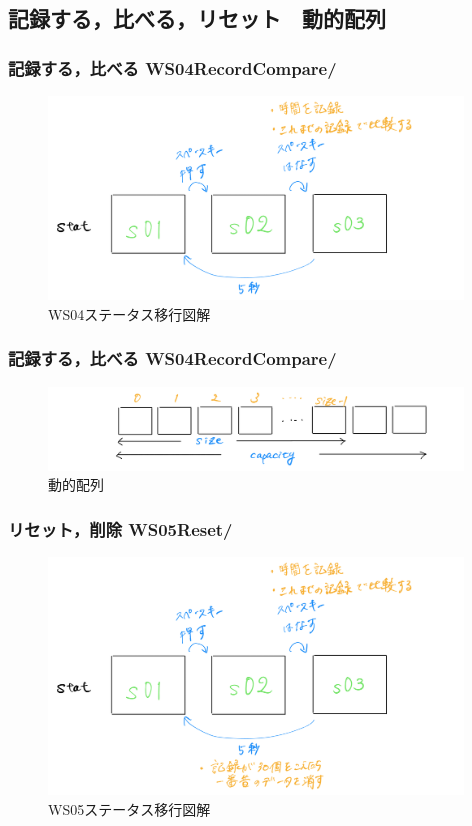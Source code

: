 \documentclass[10pt, dvipdfmx]{beamer}
\begin{document}
    \subsection{記録する，比べる，リセット　動的配列}
        \begin{frame}
            \frametitle{記録する，比べる WS04RecordCompare/}
            \begin{figure}[htb]
                 \includegraphics[width=110mm]{images/ws04-1.png}
                 \caption{WS04ステータス移行図解}
                \label{fig:15}
            \end{figure}
        \end{frame}

        \begin{frame}
            \frametitle{記録する，比べる WS04RecordCompare/}
            \begin{figure}[htb]
                 \includegraphics[width=110mm]{images/ws04-2.png}
                 \caption{動的配列}
                \label{fig:16}
            \end{figure}
        \end{frame}

        \begin{frame}
            \frametitle{リセット，削除 WS05Reset/}
            \begin{figure}[htb]
                 \includegraphics[width=110mm]{images/ws05-1.png}
                 \caption{WS05ステータス移行図解}
                \label{fig:17}
            \end{figure}
        \end{frame}
\end{document}
